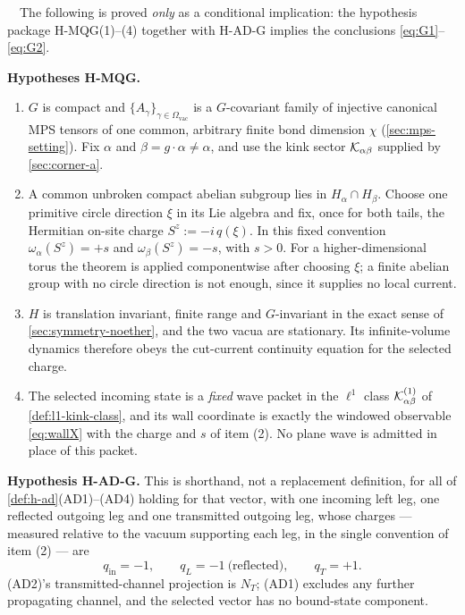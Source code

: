 \begin{theorem}
\label{thm:M-quant-G}
\statusProvedConditional\ \ The following is proved \emph{only} as a
conditional implication: the hypothesis package H-MQG(1)--(4) together with
H-AD-G implies the conclusions \eqref{eq:G1}--\eqref{eq:G2}.

\smallskip
\noindent\textbf{Hypotheses H-MQG.}
\begin{enumerate}
\item[(1)] $G$ is compact and $\{A_\gamma\}_{\gamma\in\Omega_{\mathrm{vac}}}$ is
  a $G$-covariant family of injective canonical MPS tensors of one common,
  arbitrary finite bond dimension $\chi$ (\cref{sec:mps-setting}). Fix $\alpha$
  and $\beta=g\cdot\alpha\neq\alpha$, and use the kink sector
  $\mathcal{K}_{\alpha\beta}$ supplied by \cref{sec:corner-a}.
\item[(2)] A common unbroken compact abelian subgroup lies in
  $H_\alpha\cap H_\beta$. Choose one primitive circle direction $\xi$ in its Lie
  algebra and fix, once for both tails, the Hermitian on-site charge
  $S^z:=-i\,q(\xi)$. In this fixed convention $\omega_\alpha(S^z)=+s$ and
  $\omega_\beta(S^z)=-s$, with $s>0$. For a higher-dimensional torus the
  theorem is applied componentwise after choosing $\xi$; a finite abelian group
  with no circle direction is not enough, since it supplies no local current.
\item[(3)] $H$ is translation invariant, finite range and $G$-invariant in the
  exact sense of \cref{sec:symmetry-noether}, and the two vacua are stationary.
  Its infinite-volume dynamics therefore obeys the cut-current continuity
  equation for the selected charge.
\item[(4)] The selected incoming state is a \emph{fixed} wave packet in the
  $\ell^1$ class $\mathcal{K}^{(1)}_{\alpha\beta}$ of \cref{def:l1-kink-class}, and its
  wall coordinate is exactly the windowed observable \eqref{eq:wallX} with the
  charge and $s$ of item (2). No plane wave is admitted in place of this packet.
\end{enumerate}

\smallskip
\noindent\textbf{Hypothesis H-AD-G.} This is shorthand, not a replacement
definition, for all of \cref{def:h-ad}(AD1)--(AD4) holding for that vector, with
one incoming left leg, one reflected outgoing leg and one transmitted outgoing
leg, whose charges --- measured relative to the vacuum supporting each leg, in
the single convention of item (2) --- are
\begin{equation}
  q_{\mathrm{in}}=-1,\qquad q_L=-1\ \text{(reflected)},\qquad q_T=+1 .
\end{equation}
(AD2)'s transmitted-channel projection is $N_T$; (AD1) excludes any further
propagating channel, and the selected vector has no bound-state component.


\end{theorem}
